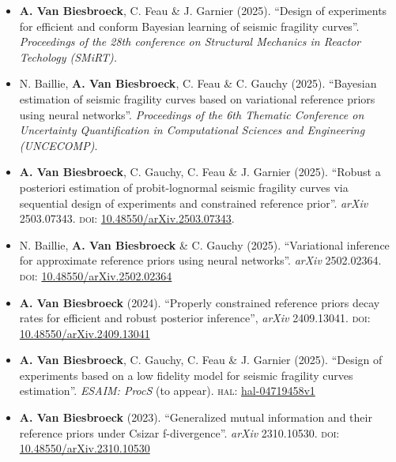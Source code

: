 \nocite{van_biesbroeck_design_2024,van_biesbroeck_generalized_2024,van_biesbroeck_influence_2023,van_biesbroeck_properly_2024,van_biesbroeck_reference_2024,baillie_variational_2025}

\begin{itemize}
    \item \textbf{A. Van Biesbroeck}, C. Feau \& J. Garnier (2025). ``Design of experiments for efficient and conform Bayesian learning of seismic fragility curves''. \emph{Proceedings of the 28th conference on Structural Mechanics in Reactor Techology (SMiRT).}
    \item N. Baillie, \textbf{A. Van Biesbroeck}, C. Feau \& C. Gauchy (2025). ``Bayesian estimation of seismic fragility curves based on variational reference priors using neural networks''. \emph{Proceedings of the 6th Thematic Conference on Uncertainty Quantification in Computational Sciences and Engineering (UNCECOMP)}.
    \item \textbf{A. Van Biesbroeck}, C. Gauchy, C. Feau \& J. Garnier (2025). ``Robust a posteriori estimation of probit-lognormal seismic fragility curves via sequential design of experiments and constrained reference prior''. \emph{arXiv} 2503.07343. \textsc{doi:} \href{https://dx.doi.org/10.48550/arXiv.2503.07343}{10.48550/arXiv.2503.07343}.
    \item N. Baillie, \textbf{A. Van Biesbroeck} \& C. Gauchy (2025). ``Variational inference for approximate reference priors using neural networks''. \emph{arXiv} 2502.02364. \textsc{doi:} \href{https://dx.doi.org/10.48550/arXiv.2502.02364}{10.48550/arXiv.2502.02364}
    \item \textbf{A. Van Biesbroeck} (2024). ``Properly constrained reference priors decay rates for efficient and robust posterior inference'', \emph{arXiv} 2409.13041. \textsc{doi:} \href{https://dx.doi.org/10.48550/arXiv.2409.13041}{10.48550/arXiv.2409.13041}
    \item \textbf{A. Van Biesbroeck}, C. Gauchy, C. Feau \& J. Garnier (2025). ``Design of experiments based on a low fidelity model for seismic fragility curves estimation''. \emph{ESAIM: ProcS} (to appear). \textsc{hal:} \href{https://hal.science/hal-04719458v1}{hal-04719458v1}
    \item \textbf{A. Van Biesbroeck} (2023). ``Generalized mutual information and their reference priors under Csizar f-divergence''. \emph{arXiv} 2310.10530. \textsc{doi:} \href{https://dx.doi.org/10.48550/arXiv.2310.10530}{10.48550/arXiv.2310.10530}

\end{itemize}
